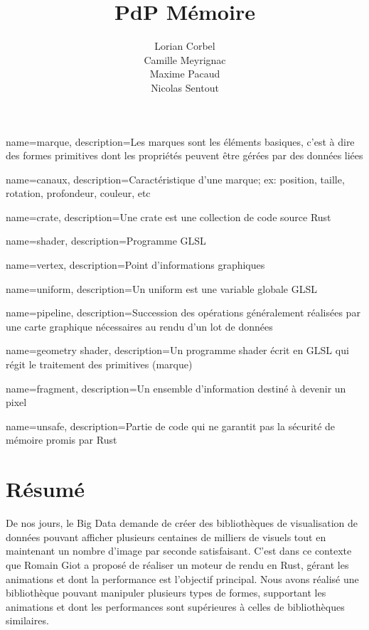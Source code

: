 \documentclass[12pt]{article}
\title{\gls{PdP} \smallbreak Mémoire }
\author{Lorian Corbel \\ Camille Meyrignac \\ Maxime Pacaud \\ Nicolas Sentout}
\begin{document}

{
    name=marque,
    description={Les marques sont les éléments basiques, c'est à dire des formes primitives dont les
    propriétés peuvent être gérées par des données liées}
}

{
    name=canaux,
    description={Caractéristique d'une marque; ex: position, taille, rotation, profondeur, couleur, etc}
}

{
    name=crate,
    description={Une crate est une collection de code source Rust}
}

{
    name=shader,
    description={Programme GLSL}
}

{
    name=vertex,
    description={Point d'informations graphiques}
}

{
    name=uniform,
    description={Un uniform est une variable globale GLSL}
}

{
    name=pipeline,
    description={Succession des opérations généralement réalisées par une carte graphique nécessaires au
    rendu d'un lot de données}
}

{
    name={geometry shader},
    description={Un programme shader écrit en GLSL qui régit le traitement des primitives (marque)}
}

{
    name={fragment},
    description={Un ensemble d'information destiné à devenir un pixel}
}

{
    name={unsafe},
    description={Partie de code qui ne garantit pas la sécurité de mémoire promis par Rust}
}

\maketitle
\tableofcontents
\newpage

\section{Résumé}

De nos jours, le Big Data demande de créer des bibliothèques de visualisation de données pouvant afficher plusieurs centaines de milliers de visuels 
tout en maintenant un nombre d'image par seconde satisfaisant.
C'est dans ce contexte que Romain Giot a proposé de réaliser un moteur de rendu en Rust, gérant les animations et dont la performance est l'objectif 
principal. Nous avons réalisé une bibliothèque pouvant manipuler plusieurs types de formes, supportant les animations et dont les performances sont 
supérieures à celles de bibliothèques similaires.
\end{document}
